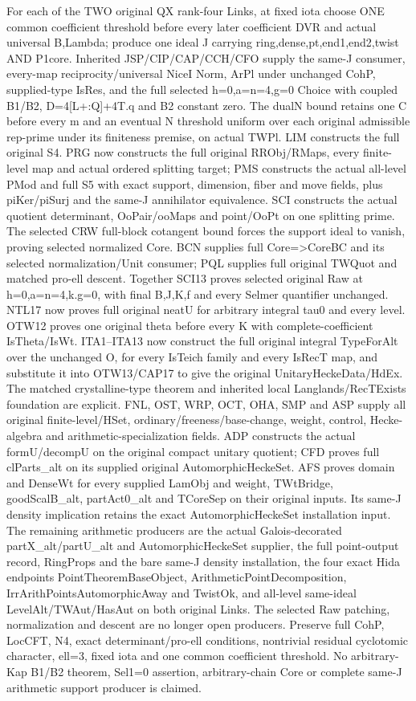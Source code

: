 For each of the TWO original QX rank-four Links, at fixed iota choose ONE common coefficient threshold before every later coefficient DVR and actual universal B,Lambda; produce one ideal J carrying ring,dense,pt,end1,end2,twist AND P1core. Inherited JSP/CIP/CAP/CCH/CFO supply the same-J consumer, every-map reciprocity/universal NiceI Norm, ArPl under unchanged CohP, supplied-type IsRes, and the full selected h=0,a=n=4,g=0 Choice with coupled B1/B2, D=4[L+:Q]+4T.q and B2 constant zero. The dualN bound retains one C before every m and an eventual N threshold uniform over each original admissible rep-prime under its finiteness premise, on actual TWPl. LIM constructs the full original S4. PRG now constructs the full original RRObj/RMaps, every finite-level map and actual ordered splitting target; PMS constructs the actual all-level PMod and full S5 with exact support, dimension, fiber and move fields, plus piKer/piSurj and the same-J annihilator equivalence. SCI constructs the actual quotient determinant, OoPair/ooMaps and point/OoPt on one splitting prime. The selected CRW full-block cotangent bound forces the support ideal to vanish, proving selected normalized Core. BCN supplies full Core=>CoreBC and its selected normalization/Unit consumer; PQL supplies full original TWQuot and matched pro-ell descent. Together SCI13 proves selected original Raw at h=0,a=n=4,k.g=0, with final B,J,K,f and every Selmer quantifier unchanged. NTL17 now proves full original neatU for arbitrary integral tau0 and every level. OTW12 proves one original theta before every K with complete-coefficient IsTheta/IsWt. ITA1–ITA13 now construct the full original integral TypeForAlt over the unchanged O, for every IsTeich family and every IsRecT map, and substitute it into OTW13/CAP17 to give the original UnitaryHeckeData/HdEx. The matched crystalline-type theorem and inherited local Langlands/RecTExists foundation are explicit. FNL, OST, WRP, OCT, OHA, SMP and ASP supply all original finite-level/HSet, ordinary/freeness/base-change, weight, control, Hecke-algebra and arithmetic-specialization fields. ADP constructs the actual formU/decompU on the original compact unitary quotient; CFD proves full clParts\_\allowbreak alt on its supplied original AutomorphicHeckeSet. AFS proves domain and DenseWt for every supplied LamObj and weight, TWtBridge, goodScalB\_\allowbreak alt, partAct0\_\allowbreak alt and TCoreSep on their original inputs. Its same-J density implication retains the exact AutomorphicHeckeSet installation input. The remaining arithmetic producers are the actual Galois-decorated partX\_\allowbreak alt/partU\_\allowbreak alt and AutomorphicHeckeSet supplier, the full point-output record, RingProps and the bare same-J density installation, the four exact Hida endpoints PointTheoremBaseObject, ArithmeticPointDecomposition, IrrArithPointsAutomorphicAway and TwistOk, and all-level same-ideal LevelAlt/TWAut/HasAut on both original Links. The selected Raw patching, normalization and descent are no longer open producers. Preserve full CohP, LocCFT, N4, exact determinant/pro-ell conditions, nontrivial residual cyclotomic character, ell=3, fixed iota and one common coefficient threshold. No arbitrary-Kap B1/B2 theorem, Sel1=0 assertion, arbitrary-chain Core or complete same-J arithmetic support producer is claimed.

